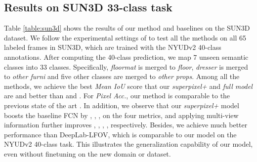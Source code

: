 \subsection{Results on SUN3D 33-class task}
\vspace{-0.15cm}
Table \ref{table:sun3d} shows the results of our method and baselines on the SUN3D dataset.
We follow the experimental settings of \cite{deng2015semantic} to test all the methods \cite{deng2015semantic,crfasrnn_iccv2015,chen2014semantic,chen2016deeplab,raghudeep2015spCNN,region_end2end2016eccv,long2015fully} on all 65 labeled frames in SUN3D,
which are trained with the NYUDv2 40-class annotations.
After computing the 40-class prediction, we map 7 unseen semantic classes into 33 classes.
Specifically, \textit{floormat} is merged to \textit{floor}, \textit{dresser} is merged to  \textit{other furni} and five other classes are merged to \textit{other  props}.
Among all the methods, we achieve the best \textit{Mean IoU} score that our \textit{superpixel+} and \textit{full model} are  and  better than \cite{deng2015semantic} and \cite{chen2016deeplab} .
For \textit{Pixel Acc.}, our method is comparable to the previous state of the art \cite{deng2015semantic}.
In addition, we observe that our \textit{superpixel+} model boosts the baseline FCN by , , ,  on the four metrics, and applying multi-view information further improves , , , , respectively.
Besides, we achieve much better performance than DeepLab-LFOV, which is comparable to our model on the NYUDv2 40-class task.
This illustrates  the generalization capability of our model, even without finetuning on the new  domain or dataset.

